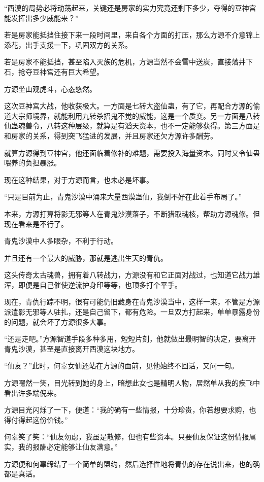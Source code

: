\begin{this_body}
“西漠的局势必将动荡起来，关键还是房家的实力究竟还剩下多少，夺得的豆神宫能发挥出多少威能来？”

若是房家能抵挡住接下来一段时间里，来自各个方面的打压，那么方源不介意锦上添花，出手支援一下，巩固双方的关系。

若是房家不能抵挡，甚至陷入灭族的危机，方源当然不会雪中送炭，直接落井下石，抢夺豆神宫还有巨大希望。

方源坐山观虎斗，心态悠然。

这次豆神宫大战，他收获极大。一方面是七转大盗仙蛊，有了它，再配合方源的偷道大宗师境界，就能利用九转杀招鬼不觉的威能，这是一个质变。另一方面是八转仙蛊魂兽令，八转这种层级，就算是有滔天资本，也不一定能够获得。第三方面是和房家的关系，得到突飞猛进的发展，并且房家还欠方源许多酬劳。

就算方源得到豆神宫，他还面临着修补的难题，需要投入海量资本。同时又令仙蛊喂养的负担暴涨。

现在这种结果，对于方源而言，也未必是坏事。

“只是目前为止，青鬼沙漠中涌来大量西漠蛊仙，我倒不好在此着手布局了。”

本来，方源打算将影无邪等人在青鬼沙漠落子，不断猎取魂核，帮助方源魂修。但现在看来是不行了。

青鬼沙漠中人多眼杂，不利于行动。

并且还有一个最大的威胁，那就是逃出生天的青仇。

这头传奇太古魂兽，拥有着八转战力，方源没有和它正面对战过，也知道它战力雄浑，即便是自己催使逆流护身印等等，也顶多打个平手。

现在，青仇行踪不明，很有可能仍旧藏身在青鬼沙漠当中，这样一来，不管是方源派遣影无邪等人驻扎，还是自己留下，都有危险。一旦双方打起来，单单暴露身份的问题，就会坏了方源很多大事。

“还是走吧。”方源智道手段多种多用，短短片刻，他就做出最明智的决定，要离开青鬼沙漠，甚至是直接离开西漠这块地方。

“仙友？”此时，何辜女仙还站在方源的面前，见他始终不回话，又问一句。

方源嘿然一笑，目光转到她的身上，暗想此女也是精明人物，居然单从我的疾飞中看出许多端倪来。

方源目光闪烁了一下，便道：“我的确有一些情报，十分珍贵，你若想要求购，也得付得起这份价钱。”

何辜笑了笑：“仙友勿虑，我虽是散修，但也有些资本。只要仙友保证这份情报属实，我的报酬必定能够让仙友满意。”

方源便和何辜缔结了一个简单的盟约，然后选择性地将青仇的存在说出来，也的确都是真话。


\end{this_body}
